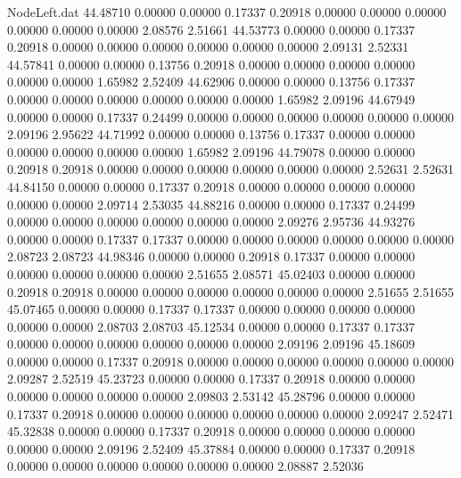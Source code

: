 \begin{filecontents}{NodeLeft.dat}
  44.48710    0.00000    0.00000     0.17337    0.20918    0.00000    0.00000    0.00000    0.00000    0.00000    0.00000    2.08576    2.51661
  44.53773    0.00000    0.00000     0.17337    0.20918    0.00000    0.00000    0.00000    0.00000    0.00000    0.00000    2.09131    2.52331
  44.57841    0.00000    0.00000     0.13756    0.20918    0.00000    0.00000    0.00000    0.00000    0.00000    0.00000    1.65982    2.52409
  44.62906    0.00000    0.00000     0.13756    0.17337    0.00000    0.00000    0.00000    0.00000    0.00000    0.00000    1.65982    2.09196
  44.67949    0.00000    0.00000     0.17337    0.24499    0.00000    0.00000    0.00000    0.00000    0.00000    0.00000    2.09196    2.95622
  44.71992    0.00000    0.00000     0.13756    0.17337    0.00000    0.00000    0.00000    0.00000    0.00000    0.00000    1.65982    2.09196
  44.79078    0.00000    0.00000     0.20918    0.20918    0.00000    0.00000    0.00000    0.00000    0.00000    0.00000    2.52631    2.52631
  44.84150    0.00000    0.00000     0.17337    0.20918    0.00000    0.00000    0.00000    0.00000    0.00000    0.00000    2.09714    2.53035
  44.88216    0.00000    0.00000     0.17337    0.24499    0.00000    0.00000    0.00000    0.00000    0.00000    0.00000    2.09276    2.95736
  44.93276    0.00000    0.00000     0.17337    0.17337    0.00000    0.00000    0.00000    0.00000    0.00000    0.00000    2.08723    2.08723
  44.98346    0.00000    0.00000     0.20918    0.17337    0.00000    0.00000    0.00000    0.00000    0.00000    0.00000    2.51655    2.08571
  45.02403    0.00000    0.00000     0.20918    0.20918    0.00000    0.00000    0.00000    0.00000    0.00000    0.00000    2.51655    2.51655
  45.07465    0.00000    0.00000     0.17337    0.17337    0.00000    0.00000    0.00000    0.00000    0.00000    0.00000    2.08703    2.08703
  45.12534    0.00000    0.00000     0.17337    0.17337    0.00000    0.00000    0.00000    0.00000    0.00000    0.00000    2.09196    2.09196
  45.18609    0.00000    0.00000     0.17337    0.20918    0.00000    0.00000    0.00000    0.00000    0.00000    0.00000    2.09287    2.52519
  45.23723    0.00000    0.00000     0.17337    0.20918    0.00000    0.00000    0.00000    0.00000    0.00000    0.00000    2.09803    2.53142
  45.28796    0.00000    0.00000     0.17337    0.20918    0.00000    0.00000    0.00000    0.00000    0.00000    0.00000    2.09247    2.52471
  45.32838    0.00000    0.00000     0.17337    0.20918    0.00000    0.00000    0.00000    0.00000    0.00000    0.00000    2.09196    2.52409
  45.37884    0.00000    0.00000     0.17337    0.20918    0.00000    0.00000    0.00000    0.00000    0.00000    0.00000    2.08887    2.52036

\end{filecontents}

